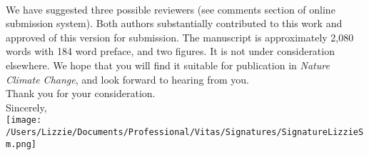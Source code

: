 \documentclass[11pt,a4paper]{article}
\begin{document}
\vspace{1.5ex}\\
We have suggested three possible reviewers (see comments section of online submission system). Both authors substantially contributed to this work and approved of this version for submission. The manuscript is approximately 2,080 words with 184 word preface, and two figures. It is not under consideration elsewhere. We hope that you will find it suitable for publication in \emph{Nature Climate Change}, and look forward to hearing from you.
\vspace{1.5ex}\\
Thank you for your consideration.
\vspace{1.5ex}\\
\noindent Sincerely,\\

 \texttt{[image: /Users/Lizzie/Documents/Professional/Vitas/Signatures/SignatureLizzieSm.png]} \\
\newpage
{}
\vspace{-5ex}

\renewcommand{\refname}{\CHead{}}

\end{document}
